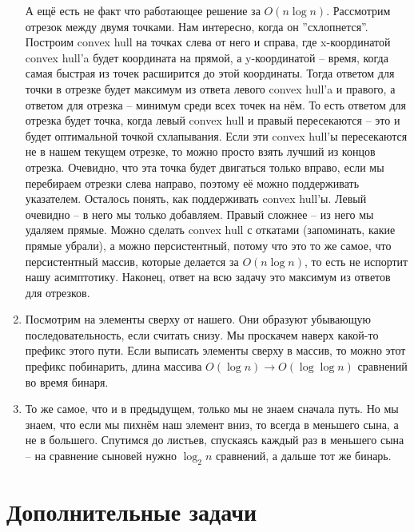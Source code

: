 \documentclass[12pt]{article}
\begin{document}
\begin{enumerate}
	А ещё есть не факт что работающее решение за $O(n\log n)$. Рассмотрим отрезок между двумя точками. Нам интересно, когда он ''схлопнется''. Построим convex hull на точках слева от него и справа, где x-координатой convex hull'a будет координата на прямой, а y-координатой -- время, когда самая быстрая из точек расширится до этой координаты. Тогда ответом для точки в отрезке будет максимум из ответа левого convex hull'a и правого, а ответом для отрезка -- минимум среди всех точек на нём. То есть ответом для отрезка будет точка, когда левый convex hull и правый пересекаются -- это и будет оптимальной точкой схлапывания. Если эти convex hull'ы пересекаются не в нашем текущем отрезке, то можно просто взять лучший из концов отрезка. Очевидно, что эта точка будет двигаться только вправо, если мы перебираем отрезки слева направо, поэтому её можно поддерживать указателем. Осталось понять, как поддерживать convex hull'ы. Левый очевидно -- в него мы только добавляем. Правый сложнее -- из него мы удаляем прямые. Можно сделать convex hull с откатами (запоминать, какие прямые убрали), а можно персистентный, потому что это то же самое, что персистентный массив, которые делается за $O(n\log n)$, то есть не испортит нашу асимптотику. Наконец, ответ на всю задачу это максимум из ответов для отрезков. \\
	\item Посмотрим на элементы сверху от нашего. Они образуют убывающую последовательность, если считать снизу. Мы проскачем наверх какой-то префикс этого пути. Если выписать элементы сверху в массив, то можно этот префикс побинарить, длина массива $O(\log n) \to O(\log\log n)$ сравнений во время бинаря.\\
	\item То же самое, что и в предыдущем, только мы не знаем сначала путь. Но мы знаем, что если мы пихнём наш элемент вниз, то всегда в меньшего сына, а не в большего. Спутимся до листьев, спускаясь каждый раз в меньшего сына -- на сравнение сыновей нужно $\log_2 n$ сравнений, а дальше тот же бинарь. \\
\end{enumerate}

\section{Дополнительные задачи}
\end{document}
